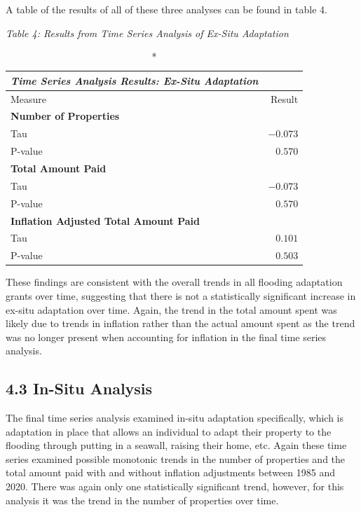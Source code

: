 \documentclass[
  12pt,
]{article}
\begin{document}
\newpage

A table of the results of all of these three analyses can be found in
table 4.

\emph{Table 4: Results from Time Series Analysis of Ex-Situ
Adaptation}\\
\captionsetup[table]{labelformat=empty,skip=1pt}

\begin{longtable}{lr}
\caption*{
{\large \emph{\textbf{Time Series Analysis Results: Ex-Situ Adaptation}}}
} \\ 
\toprule
Measure & Result \\ 
\midrule
\multicolumn{1}{l}{\textbf{Number of Properties}} \\ 
\midrule
Tau & $-0.073$ \\ 
P-value & $0.570$ \\ 
\midrule
\multicolumn{1}{l}{\textbf{Total Amount Paid}} \\ 
\midrule
Tau & $-0.073$ \\ 
P-value & $0.570$ \\ 
\midrule
\multicolumn{1}{l}{\textbf{Inflation Adjusted Total Amount Paid}} \\ 
\midrule
Tau & $0.101$ \\ 
P-value & $0.503$ \\ 
\bottomrule
\end{longtable}

These findings are consistent with the overall trends in all flooding
adaptation grants over time, suggesting that there is not a
statistically significant increase in ex-situ adaptation over time.
Again, the trend in the total amount spent was likely due to trends in
inflation rather than the actual amount spent as the trend was no longer
present when accounting for inflation in the final time series analysis.

\hypertarget{in-situ-analysis}{%
\subsection{4.3 In-Situ Analysis}\label{in-situ-analysis}}

The final time series analysis examined in-situ adaptation specifically,
which is adaptation in place that allows an individual to adapt their
property to the flooding through putting in a seawall, raising their
home, etc. Again these time series examined possible monotonic trends in
the number of properties and the total amount paid with and without
inflation adjustments between 1985 and 2020. There was again only one
statistically significant trend, however, for this analysis it was the
trend in the number of properties over time.
\end{document}
